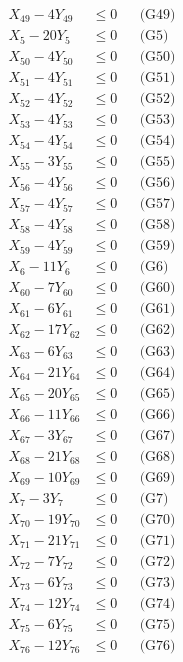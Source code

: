 \documentclass[a4paper,10pt]{article}
\begin{document}
{\begin{align}
X_{49} - 4Y_{49} &\leq 0 && \text{(G49)} \\
X_{5} - 20Y_{5} &\leq 0 && \text{(G5)} \\
X_{50} - 4Y_{50} &\leq 0 && \text{(G50)} \\
X_{51} - 4Y_{51} &\leq 0 && \text{(G51)} \\
X_{52} - 4Y_{52} &\leq 0 && \text{(G52)} \\
X_{53} - 4Y_{53} &\leq 0 && \text{(G53)} \\
X_{54} - 4Y_{54} &\leq 0 && \text{(G54)} \\
X_{55} - 3Y_{55} &\leq 0 && \text{(G55)} \\
X_{56} - 4Y_{56} &\leq 0 && \text{(G56)} \\
X_{57} - 4Y_{57} &\leq 0 && \text{(G57)} \\
X_{58} - 4Y_{58} &\leq 0 && \text{(G58)} \\
X_{59} - 4Y_{59} &\leq 0 && \text{(G59)} \\
\allowbreak
X_{6} - 11Y_{6} &\leq 0 && \text{(G6)} \\
X_{60} - 7Y_{60} &\leq 0 && \text{(G60)} \\
X_{61} - 6Y_{61} &\leq 0 && \text{(G61)} \\
X_{62} - 17Y_{62} &\leq 0 && \text{(G62)} \\
X_{63} - 6Y_{63} &\leq 0 && \text{(G63)} \\
X_{64} - 21Y_{64} &\leq 0 && \text{(G64)} \\
X_{65} - 20Y_{65} &\leq 0 && \text{(G65)} \\
X_{66} - 11Y_{66} &\leq 0 && \text{(G66)} \\
X_{67} - 3Y_{67} &\leq 0 && \text{(G67)} \\
X_{68} - 21Y_{68} &\leq 0 && \text{(G68)} \\
X_{69} - 10Y_{69} &\leq 0 && \text{(G69)} \\
X_{7} - 3Y_{7} &\leq 0 && \text{(G7)} \\
X_{70} - 19Y_{70} &\leq 0 && \text{(G70)} \\
X_{71} - 21Y_{71} &\leq 0 && \text{(G71)} \\
X_{72} - 7Y_{72} &\leq 0 && \text{(G72)} \\
X_{73} - 6Y_{73} &\leq 0 && \text{(G73)} \\
X_{74} - 12Y_{74} &\leq 0 && \text{(G74)} \\
X_{75} - 6Y_{75} &\leq 0 && \text{(G75)} \\
X_{76} - 12Y_{76} &\leq 0 && \text{(G76)} \\

\end{align}}
\end{document}
